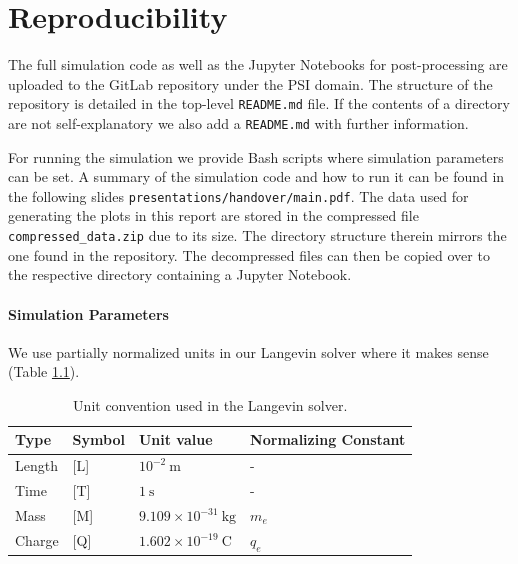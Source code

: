 \appendix

\chapter{Reproducibility}
\label{appendix:simulationParams}

The full simulation code as well as the Jupyter Notebooks for post-processing are uploaded to the
GitLab repository \cite{tobiaStudentRepo} under the PSI domain.
The structure of the repository is detailed in the top-level \texttt{README.md} file.
If the contents of a directory are not self-explanatory we also add a \texttt{README.md} with
further information.

For running the simulation we provide Bash scripts where simulation parameters can be set.
A summary of the simulation code and how to run it can be found in the following slides
\texttt{presentations/handover/main.pdf}.
The data used for generating the plots in this report are stored in the compressed file
\texttt{compressed\_data.zip} due to its size.
The directory structure therein mirrors the one found in the repository.
The decompressed files can then be copied over to the respective directory containing a Jupyter
Notebook.

\subsubsection{Simulation Parameters}

We use partially normalized units in our Langevin solver where it makes sense (Table
\ref{table:langevinUnits}).

\begin{table}[h]
    \caption{Unit convention used in the Langevin solver.}
    \label{table:langevinUnits}
    \begin{center}
        \begin{tabular}[c]{llll}
            \toprule
            \multicolumn{1}{l}{\textbf{Type}} & 
            \multicolumn{1}{l}{\textbf{Symbol}} & 
            \multicolumn{1}{l}{\textbf{Unit value}} &
            \multicolumn{1}{l}{\textbf{Normalizing Constant}} \\
            \hline
            Length & [L] & $10^{-2}\ \text{m}$ & -\\
            Time & [T] & $1\ \text{s}$ & - \\
            Mass & [M] & $9.109\times10^{-31}\ \text{kg}$ & $m_e$ \\
            Charge & [Q] & $1.602\times10^{-19}\ \text{C}$ & $q_e$ \\
            \hline
        \end{tabular}
    \end{center}
\end{table}

